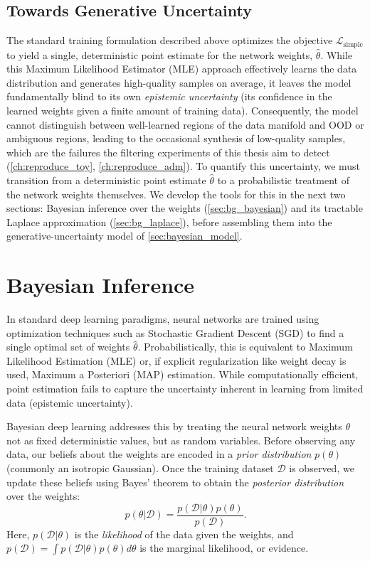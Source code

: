 \subsection{Towards Generative Uncertainty}
The standard training formulation described above optimizes the objective $\mathcal{L}_{\mathrm{simple}}$ to yield a single, deterministic point estimate for the network weights, $\hat{\theta}$. While this Maximum Likelihood Estimator (\acs{MLE}) approach effectively learns the data distribution and generates high-quality samples on average, it leaves the model fundamentally blind to its own \emph{epistemic uncertainty} (its confidence in the learned weights given a finite amount of training data). Consequently, the model cannot distinguish between well-learned regions of the data manifold and \acs{OOD} or ambiguous regions, leading to the occasional synthesis of low-quality samples, which are the failures the filtering experiments of this thesis aim to detect (\autoref{ch:reproduce_toy}, \autoref{ch:reproduce_adm}). To quantify this uncertainty, we must transition from a deterministic point estimate $\hat{\theta}$ to a probabilistic treatment of the network weights themselves. We develop the tools for this in the next two sections: Bayesian inference over the weights (\autoref{sec:bg_bayesian}) and its tractable Laplace approximation (\autoref{sec:bg_laplace}), before assembling them into the generative-uncertainty model of \autoref{sec:bayesian_model}.



\section{Bayesian Inference}
\label{sec:bg_bayesian}

In standard deep learning paradigms, neural networks are trained using optimization techniques such as Stochastic Gradient Descent (SGD) to find a single optimal set of weights $\hat{\theta}$. Probabilistically, this is equivalent to Maximum Likelihood Estimation (\acs{MLE}) or, if explicit regularization like weight decay is used, Maximum a Posteriori (\acs{MAP}) estimation. While computationally efficient, point estimation fails to capture the uncertainty inherent in learning from limited data (epistemic uncertainty). 

Bayesian deep learning addresses this by treating the neural network weights $\theta$ not as fixed deterministic values, but as random variables. Before observing any data, our beliefs about the weights are encoded in a \textit{prior distribution} $p(\theta)$ (commonly an isotropic Gaussian). Once the training dataset $\mathcal{D}$ is observed, we update these beliefs using Bayes' theorem to obtain the \textit{posterior distribution} over the weights:
\begin{equation}
    p(\theta | \mathcal{D}) = \frac{p(\mathcal{D} | \theta) p(\theta)}{p(\mathcal{D})}.
\end{equation}
Here, $p(\mathcal{D} | \theta)$ is the \textit{likelihood} of the data given the weights, and $p(\mathcal{D}) = \int p(\mathcal{D} | \theta) p(\theta) d\theta$ is the marginal likelihood, or evidence.

